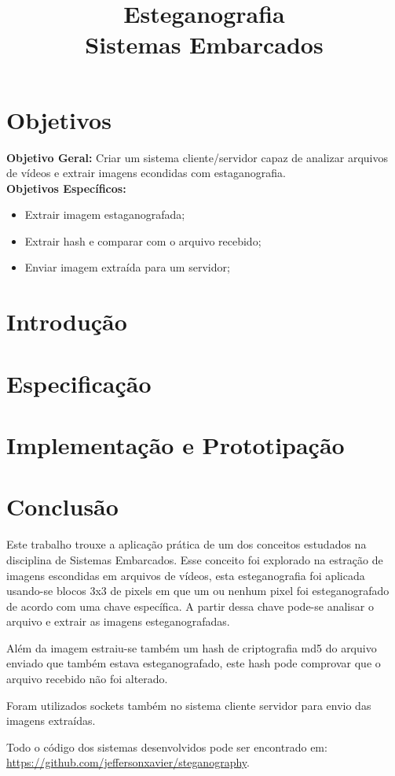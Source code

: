 \documentclass[journal,transmag]{IEEEtran}
\begin{document}
\title{Esteganografia\\ Sistemas Embarcados}

\author{}


\maketitle

\section{Objetivos}

\textbf{Objetivo Geral:} Criar um sistema cliente/servidor capaz de analizar arquivos de vídeos e extrair imagens econdidas com estaganografia.
\\

\textbf{Objetivos Específicos:}
\begin{itemize}
	\item Extrair imagem estaganografada;
	\item Extrair hash e comparar com o arquivo recebido;
	\item Enviar imagem extraída para um servidor;
\end{itemize}

\section{Introdução}

\section{Especificação}

\section{Implementação e Prototipação}

\section{Conclusão}

Este trabalho trouxe a aplicação prática de um dos conceitos estudados na disciplina de Sistemas Embarcados. Esse conceito foi explorado na estração de imagens escondidas em arquivos de vídeos, esta esteganografia foi aplicada usando-se blocos 3x3 de pixels em que um ou nenhum pixel foi esteganografado de acordo com uma chave específica. A partir dessa chave pode-se analisar o arquivo e extrair as imagens esteganografadas.

Além da imagem estraiu-se também um hash de criptografia md5 do arquivo enviado que também estava esteganografado, este hash pode comprovar que o arquivo recebido não foi alterado.

Foram utilizados sockets também no sistema cliente servidor para envio das imagens extraídas.

Todo o código dos sistemas desenvolvidos pode ser encontrado em: \url{https://github.com/jeffersonxavier/steganography}.
\end{document}
